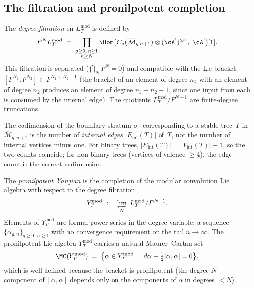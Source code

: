 \subsection{The filtration and pronilpotent completion}

\begin{definition}
The \emph{degree filtration} on $L_T^{\mathrm{mod}}$ is defined by
\begin{equation}
F^N L_T^{\mathrm{mod}}
\;=\;
\prod_{\substack{g \ge 0,\, n \ge 1 \\ n \ge N}}
\Hom\bigl(
C_\ast(\overline{\mathcal{M}}_{g, n+1})
\otimes (\cA^!)^{\otimes n},\;
\cA^!
\bigr)[1].
\end{equation}
This filtration is separated ($\bigcap_N F^N = 0$) and compatible
with the Lie bracket: $[F^{N_1}, F^{N_2}] \subset
F^{N_1 + N_2 - 1}$ (the bracket of an element of degree $n_1$ with
an element of degree $n_2$ produces an element of degree
$n_1 + n_2 - 1$, since one input from each is consumed by the
internal edge). The quotients $L_T^{\mathrm{mod}} / F^{N+1}$ are
finite-degree truncations.

The codimension of the boundary stratum $\sigma_T$ corresponding to
a stable tree~$T$ in $\overline{\mathcal{M}}_{g,n+1}$ is the
number of \emph{internal edges} $|E_{\mathrm{int}}(T)|$ of~$T$,
not the number of internal vertices minus one. For binary trees,
$|E_{\mathrm{int}}(T)| = |V_{\mathrm{int}}(T)| - 1$, so the two
counts coincide; for non-binary trees (vertices of valence
$\ge 4$), the edge count is the correct codimension.
\end{definition}

\begin{definition}
The \emph{pronilpotent Yangian} is the completion of the modular
convolution Lie algebra with respect to the degree filtration:
\begin{equation}
Y_T^{\mathrm{mod}}
\;:=\;
\varprojlim_{N} \;
L_T^{\mathrm{mod}} / F^{N+1}.
\end{equation}
Elements of $Y_T^{\mathrm{mod}}$ are formal power series in the
degree variable: a sequence $\{\alpha_{g,n}\}_{g \ge 0,\, n \ge 1}$
with no convergence requirement on the tail $n \to \infty$. The
pronilpotent Lie algebra $Y_T^{\mathrm{mod}}$ carries a natural
Maurer--Cartan set
\begin{equation}
\MC(Y_T^{\mathrm{mod}})
\;=\;
\bigl\{\alpha \in Y_T^{\mathrm{mod}}
\;\bigm|\;
d\alpha + \tfrac{1}{2}[\alpha, \alpha] = 0
\bigr\},
\end{equation}
which is well-defined because the bracket is pronilpotent
(the degree-$N$ component of $[\alpha, \alpha]$ depends only on
the components of $\alpha$ in degrees $< N$).
\end{definition}

